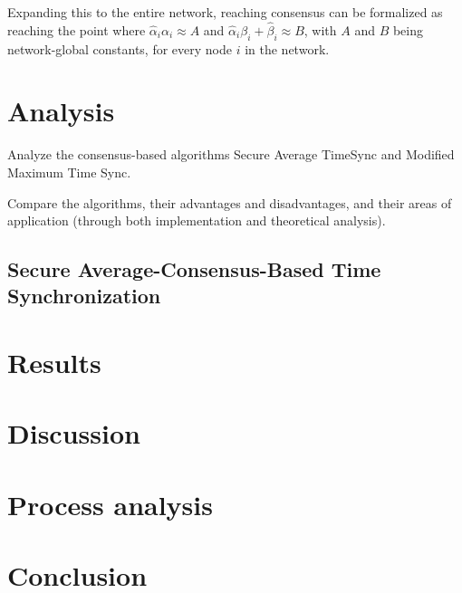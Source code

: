 \documentclass[a4paper,12pt]{article}
\begin{document}
Expanding this to the entire network, reaching consensus can be formalized as reaching the point where $\hat\alpha_i \alpha_i \approx A$ and $\hat\alpha_i \beta_i + \hat\beta_i \approx B$, with $A$ and $B$ being network-global constants, for every node $i$ in the network.


    

\section{Analysis}%

Analyze the consensus-based algorithms Secure Average TimeSync and Modified Maximum Time Sync. 

Compare the algorithms, their advantages and disadvantages, and their areas of application (through both implementation and theoretical analysis).

\subsection{Secure Average-Consensus-Based Time Synchronization}


\section{Results}


\section{Discussion}

\section{Process analysis}%

\section{Conclusion}



\nocite{*} %
\printbibliography
\end{document}
